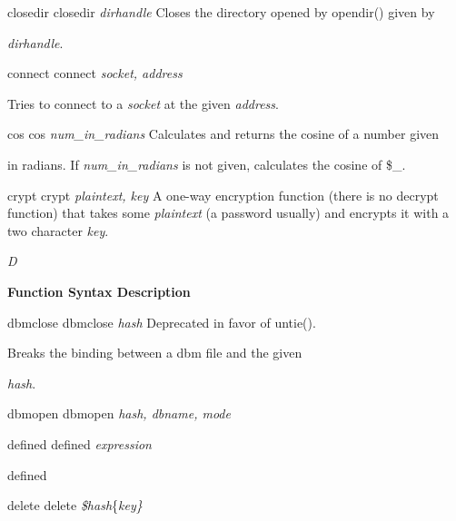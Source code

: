 \documentclass[a4paper,11pt]{book}
\begin{document}
\noindent 

\noindent closedir closedir \textit{dirhandle }Closes the directory opened by opendir()   given by

\noindent \textit{dirhandle}.

\noindent 

\noindent connect connect \textit{socket, address}

\noindent 

\noindent Tries to connect to a \textit{socket }at the given \textit{address}.

\noindent 

\noindent cos cos \textit{num\_in\_radians }Calculates and returns the cosine of a number given

\noindent in radians. If \textit{num\_in\_radians }is not given, calculates the cosine of \$\_.

\noindent 

\noindent crypt crypt \textit{plaintext, key }A one-way encryption function (there is no decrypt function) that takes some \textit{plaintext }(a password usually) and encrypts it with a two character \textit{key}.

\noindent 

\noindent 

\noindent \textit{D}

\noindent 

\noindent \textbf{Function Syntax Description}

\noindent 

\noindent dbmclose dbmclose \textit{hash }Deprecated in favor of untie().

\noindent 

\noindent Breaks the binding between a dbm file and the given

\noindent \textit{hash}.

\noindent 

\noindent dbmopen dbmopen \textit{hash, dbname, mode}

\noindent 

\noindent 

\noindent 

\noindent 

\noindent 

\noindent defined defined \textit{expression}

\noindent 

\noindent defined

\noindent 

\noindent delete delete \textit{\$hash}\{\textit{key\}}
\end{document}
